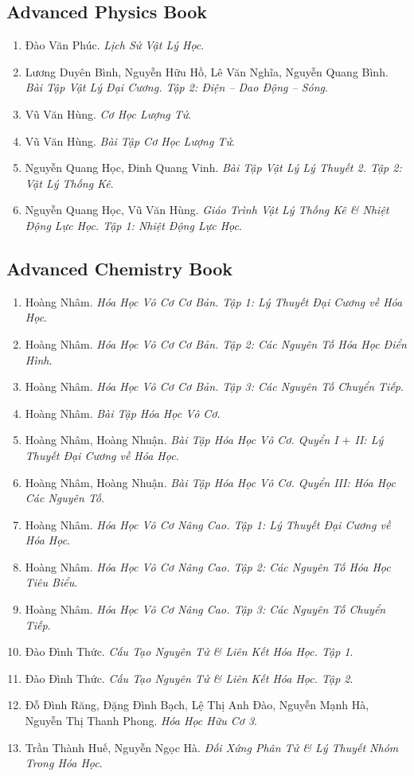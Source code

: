 \documentclass{article}
\numberwithin{equation}{section}
\begin{document}
\subsection{Advanced Physics Book}
\begin{enumerate}
	\item Đào Văn Phúc. \textit{Lịch Sử Vật Lý Học}.
	\item Lương Duyên Bình, Nguyễn Hữu Hồ, Lê Văn Nghĩa, Nguyễn Quang Bình. \textit{Bài Tập Vật Lý Đại Cương. Tập 2: Điện -- Dao Động -- Sóng}.
	\item Vũ Văn Hùng. \textit{Cơ Học Lượng Tử}.
	\item Vũ Văn Hùng. \textit{Bài Tập Cơ Học Lượng Tử}.
	\item Nguyễn Quang Học, Đinh Quang Vinh. \textit{Bài Tập Vật Lý Lý Thuyết 2. Tập 2: Vật Lý Thống Kê}.
	\item Nguyễn Quang Học, Vũ Văn Hùng. \textit{Giáo Trình Vật Lý Thống Kê \& Nhiệt Động Lực Học. Tập 1: Nhiệt Động Lực Học}.
\end{enumerate}


\subsection{Advanced Chemistry Book}
\begin{enumerate}
	\item Hoàng Nhâm. \textit{Hóa Học Vô Cơ Cơ Bản. Tập 1: Lý Thuyết Đại Cương về Hóa Học}.
	\item Hoàng Nhâm. \textit{Hóa Học Vô Cơ Cơ Bản. Tập 2: Các Nguyên Tố Hóa Học Điển Hình}.
	\item Hoàng Nhâm. \textit{Hóa Học Vô Cơ Cơ Bản. Tập 3: Các Nguyên Tố Chuyển Tiếp}.
	\item Hoàng Nhâm. \textit{Bài Tập Hóa Học Vô Cơ}.
	\item Hoàng Nhâm, Hoàng Nhuận. \textit{Bài Tập Hóa Học Vô Cơ. Quyển I $+$ II: Lý Thuyết Đại Cương về Hóa Học}.
	\item Hoàng Nhâm, Hoàng Nhuận. \textit{Bài Tập Hóa Học Vô Cơ. Quyển III: Hóa Học Các Nguyên Tố}.
	\item Hoàng Nhâm. \textit{Hóa Học Vô Cơ Nâng Cao. Tập 1: Lý Thuyết Đại Cương về Hóa Học}.
	\item Hoàng Nhâm. \textit{Hóa Học Vô Cơ Nâng Cao. Tập 2: Các Nguyên Tố Hóa Học Tiêu Biểu}.
	\item Hoàng Nhâm. \textit{Hóa Học Vô Cơ Nâng Cao. Tập 3: Các Nguyên Tố Chuyển Tiếp}.
	\item Đào Đình Thức. \textit{Cấu Tạo Nguyên Tử \& Liên Kết Hóa Học. Tập 1}.
	\item Đào Đình Thức. \textit{Cấu Tạo Nguyên Tử \& Liên Kết Hóa Học. Tập 2}.
	\item Đỗ Đình Răng, Đặng Đình Bạch, Lệ Thị Anh Đào, Nguyễn Mạnh Hà, Nguyễn Thị Thanh Phong. \textit{Hóa Học Hữu Cơ 3}.
	\item Trần Thành Huế, Nguyễn Ngọc Hà. \textit{Đối Xứng Phân Tử \& Lý Thuyết Nhóm Trong Hóa Học}.
\end{enumerate}
\end{document}
